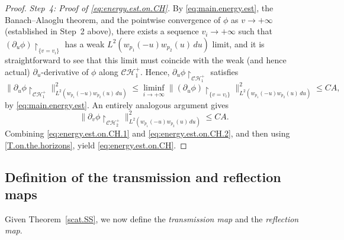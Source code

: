 \documentclass[10pt, reqno]{amsart}
\theoremstyle{definition}
\theoremstyle{remark}
\numberwithin{equation}{section}
\newcommand{\rd}{\partial}
\newcommand{\0}{\emptyset}
\newcommand{\calC}{\mathcal C}
\newcommand{\calH}{\mathcal H}
\newcommand{\CH}{\calC \calH^{+}}		%
\newcommand{\pfstep}[1]{\vspace{.5em} {\it #1.}}
\begin{document}
\begin{proof}
\pfstep{Step~4: Proof of \eqref{eq:energy.est.on.CH}} By \eqref{eq:main.energy.est}, the Banach--Alaoglu theorem, and the pointwise convergence of $\phi$ as $v\to +\infty$ (established in Step~2 above), there exists a sequence $v_i \to +\infty$ such that $(\rd_u\phi)\restriction_{\{v=v_i\}}$ has a weak $L^2(w_{p_1}(-u) w_{p_2}(u)\, du)$ limit, and it is straightforward to see that this limit must coincide with the weak (and hence actual) $\partial_u$-derivative of $\phi$ along $\CH_1$. Hence, $\rd_u \phi \restriction_{\CH_1}$ satisfies
\begin{equation}\label{eq:energy.est.on.CH.1}
\|\rd_u \phi \restriction_{\CH_1} \|_{L^2(w_{p_1}(-u) w_{p_2}(u)\, du)}^2 \leq \liminf_{i\to +\infty} \| (\rd_u\phi)\restriction_{\{v=v_i\}}\|_{L^2(w_{p_1}(-u) w_{p_2}(u)\, du)}^2 \leq CA,
\end{equation}
by \eqref{eq:main.energy.est}. An entirely analogous argument gives
\begin{equation}\label{eq:energy.est.on.CH.2}
\|\rd_v \phi \restriction_{\CH_2} \|_{L^2(w_{p_1}(-u) w_{p_2}(u)\, du)}^2 \leq CA.
\end{equation}
Combining \eqref{eq:energy.est.on.CH.1} and \eqref{eq:energy.est.on.CH.2}, and then using \eqref{T.on.the.horizons}, yield \eqref{eq:energy.est.on.CH}.
\qedhere


\end{proof}

\subsection{Definition of the transmission and reflection maps}\label{sec:scat.ss}

Given Theorem~\ref{scat.SS}, we now define the \emph{transmission map} and the \emph{reflection map}. 
\end{document}
